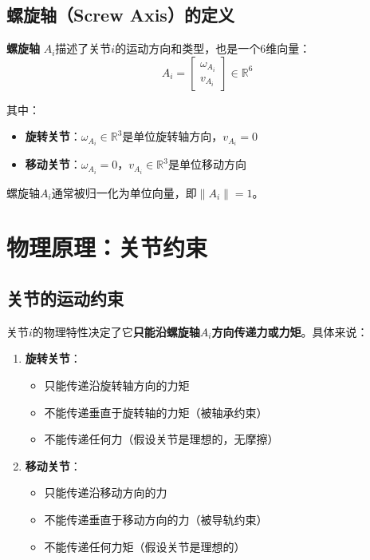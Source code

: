 \documentclass[12pt,a4paper]{article}
\begin{document}
\subsection{螺旋轴（Screw Axis）的定义}

\textbf{螺旋轴} $A_i$描述了关节$i$的运动方向和类型，也是一个6维向量：
\begin{equation}
A_i = \begin{bmatrix}
\omega_{A_i} \\
v_{A_i}
\end{bmatrix} \in \mathbb{R}^6
\end{equation}

其中：
\begin{itemize}
\item \textbf{旋转关节}：$\omega_{A_i} \in \mathbb{R}^3$是单位旋转轴方向，$v_{A_i} = 0$
\item \textbf{移动关节}：$\omega_{A_i} = 0$，$v_{A_i} \in \mathbb{R}^3$是单位移动方向
\end{itemize}

螺旋轴$A_i$通常被归一化为单位向量，即$\|A_i\| = 1$。

\section{物理原理：关节约束}

\subsection{关节的运动约束}

关节$i$的物理特性决定了它\textbf{只能沿螺旋轴$A_i$方向传递力或力矩}。具体来说：

\begin{enumerate}
\item \textbf{旋转关节}：
\begin{itemize}
\item 只能传递沿旋转轴方向的力矩
\item 不能传递垂直于旋转轴的力矩（被轴承约束）
\item 不能传递任何力（假设关节是理想的，无摩擦）
\end{itemize}

\item \textbf{移动关节}：
\begin{itemize}
\item 只能传递沿移动方向的力
\item 不能传递垂直于移动方向的力（被导轨约束）
\item 不能传递任何力矩（假设关节是理想的）
\end{itemize}
\end{enumerate}
\end{document}
